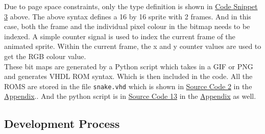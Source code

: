 \documentclass[aps, secnumarabic, balancelastpage, asmath, amssymb, nofootinbib, floatfix,]{revtex4-2}
\begin{document}
{Due to page space constraints, only the type definition is shown in \hyperref[code:3]{Code Snippet 3} above. The above syntax defines a 16 by 16 sprite with 2 frames. And in this case, both the frame and the individual pixel colour in the bitmap needs to be indexed. A simple counter signal is used to index the current frame of the animated sprite. Within the current frame, the x and y counter values are used to get the RGB colour value.\\
These bit maps are generated by a Python script which takes in a GIF or PNG and generates VHDL ROM syntax. Which is then included in the code. All the ROMS are stored in the file \verb|snake.vhd| which is shown in \hyperref[code:snake]{Source Code 2} in the \hyperref[sec:app]{Appendix}.. And the python script is in \hyperref[code:py]{Source Code 13} in the \hyperref[sec:app]{Appendix} as well.

\vspace{-1em}
\subsection{\fontsize{11.4pt}{12pt}\selectfont \bf Development Process \label{sec:2.3}}









}
\end{document}
